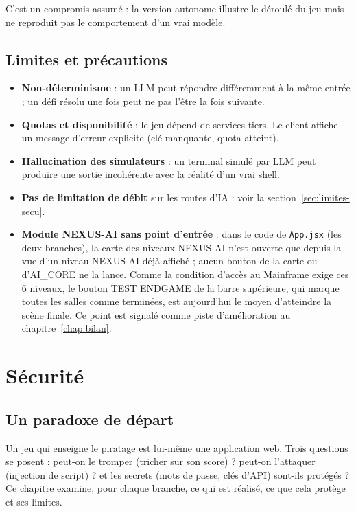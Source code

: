 \documentclass[11pt,a4paper]{report}
\newcommand{\file}[1]{\texttt{\nolinkurl{#1}}}
\begin{document}
C'est un compromis assum\'e : la version autonome illustre le d\'eroul\'e du jeu mais ne
reproduit pas le comportement d'un vrai mod\`ele.

\section{Limites et pr\'ecautions}
\label{sec:limites-pi}

\begin{itemize}
  \item \textbf{Non-d\'eterminisme} : un LLM peut r\'epondre diff\'eremment \`a la m\^eme
        entr\'ee ; un d\'efi r\'esolu une fois peut ne pas l'\^etre la fois suivante.
  \item \textbf{Quotas et disponibilit\'e} : le jeu d\'epend de services tiers. Le client
        affiche un message d'erreur explicite (cl\'e manquante, quota atteint).
  \item \textbf{Hallucination des simulateurs} : un terminal simul\'e par LLM peut produire
        une sortie incoh\'erente avec la r\'ealit\'e d'un vrai shell.
  \item \textbf{Pas de limitation de d\'ebit} sur les routes d'IA : voir la
        section~\ref{sec:limites-secu}.
  \item \textbf{Module NEXUS-AI sans point d'entr\'ee} : dans le code de
        \file{App.jsx} (les deux branches), la carte des niveaux NEXUS-AI n'est
        ouverte que depuis la vue d'un niveau NEXUS-AI d\'ej\`a affich\'e ; aucun
        bouton de la carte ou d'AI\_CORE ne la lance. Comme la condition d'acc\`es au
        Mainframe exige ces 6 niveaux, le bouton \og TEST ENDGAME \fg{} de la barre
        sup\'erieure, qui marque toutes les salles comme termin\'ees, est
        aujourd'hui le moyen d'atteindre la sc\`ene finale. Ce point est signal\'e
        comme piste d'am\'elioration au chapitre~\ref{chap:bilan}.
\end{itemize}

\chapter{S\'ecurit\'e}
\label{chap:secu}

\section{Un paradoxe de d\'epart}

Un jeu qui enseigne le piratage est lui-m\^eme une application web. Trois questions se
posent : peut-on le tromper (tricher sur son score) ? peut-on l'attaquer (injection de
script) ? et les secrets (mots de passe, cl\'es d'API) sont-ils prot\'eg\'es ? Ce chapitre
examine, pour chaque branche, ce qui est r\'ealis\'e, ce que cela prot\`ege et ses limites.
\end{document}
